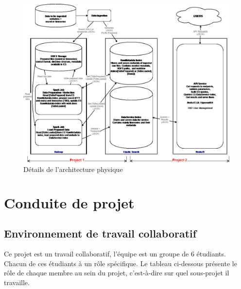 \documentclass[a4paper]{article}
\begin{document}
\begin{figure}[h]
	\centering
	\includegraphics[width=\textwidth]{./tmp/ArchiPhy.png}
	\caption{Détails de l'architecture physique}
\end{figure}

\section{Conduite de projet}

\subsection{Environnement de travail collaboratif}

Ce projet est un travail collaboratif, l’équipe est un groupe de 6 étudiants. Chacun de ces étudiants
à un rôle spécifique. Le tableau ci-dessous présente le rôle de chaque membre au sein du projet,
c’est-à-dire sur quel sous-projet il travaille.
\end{document}
